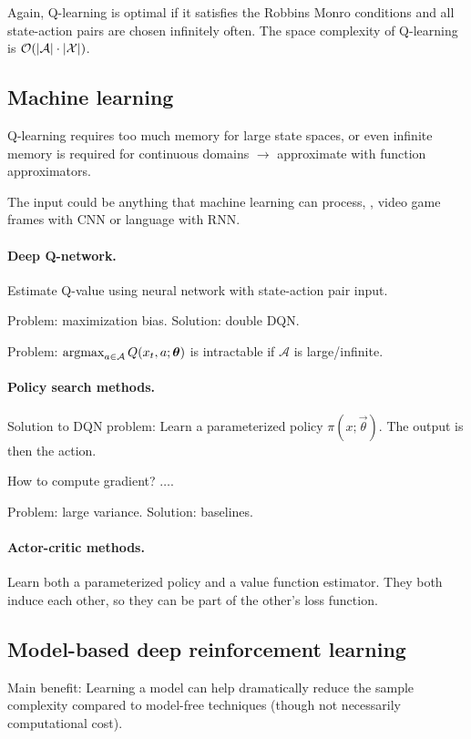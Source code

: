 Again, Q-learning is optimal if it satisfies the Robbins Monro conditions and
all state-action pairs are chosen infinitely often. The space complexity of
Q-learning is $\bigo{|\mathcal{A}| \cdot |\mathcal{X}|}$.

\subsection{Machine learning}

Q-learning requires too much memory for large state spaces, or even infinite
memory is required for continuous domains $\rightarrow$ approximate with
function approximators.

The input could be anything that machine learning can process, \eg, video game
frames with CNN or language with RNN.

\paragraph{Deep Q-network.}

Estimate Q-value using neural network with state-action pair input.

Problem: maximization bias. Solution: double DQN.

Problem: $\operatorname*{argmax}_{a\in\mathcal{A}} Q(x_t, a; \bm{\theta})$ is intractable if
$\mathcal{A}$ is large/infinite.

\paragraph{Policy search methods.}

Solution to DQN problem: Learn a parameterized policy $\pi(x; \vec{\theta})$.
The output is then the action.

How to compute gradient? $\ldots$.

Problem: large variance. Solution: baselines.

\paragraph{Actor-critic methods.}

Learn both a parameterized policy and a value function estimator. They both
induce each other, so they can be part of the other's loss function.

\subsection{Model-based deep reinforcement learning}

Main benefit: Learning a model can help dramatically reduce the sample
complexity compared to model-free techniques (though not necessarily
computational cost).


